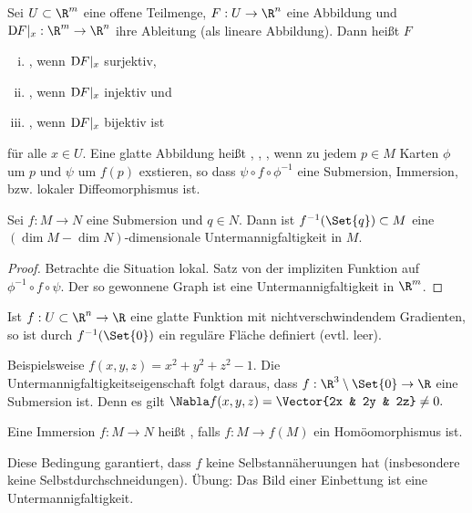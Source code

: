 \begin{df}
    Sei $U \subset \R^m$ eine offene Teilmenge, $F: U \to \R^n$ eine Abbildung und $\Df[F]|_{x}: \R^m \to \R^n$ ihre Ableitung (als lineare Abbildung).
    Dann heißt $F$
    \begin{enumerate}[i)]
        \item
            , wenn $\Df[F]|_{x}$ surjektiv,
        \item
            , wenn $\Df[F]|_{x}$ injektiv und
        \item
            , wenn $\Df[F]|_{x}$ bijektiv ist
    \end{enumerate}
    für alle $x \in U$.
    Eine glatte Abbildung heißt , , , wenn zu jedem $p \in M$ Karten $\phi$ um $p$ und $\psi$ um $f(p)$ exstieren, so dass $\psi \circ f \circ \phi^{-1}$ eine Submersion, Immersion, bzw. lokaler Diffeomorphismus ist.
\end{df}

\begin{st} \label{2.5}
    Sei $f: M \to N$ eine Submersion und $q \in N$.
    Dann ist $f^{-1}(\Set{q}) \subset M$ eine $(\dim M - \dim N)$-dimensionale Untermannigfaltigkeit in $M$.
    \begin{proof}
        Betrachte die Situation lokal.
        Satz von der impliziten Funktion auf $\phi^{-1} \circ f \circ \psi$.
        Der so gewonnene Graph ist eine Untermannigfaltigkeit in $\R^m$.
    \end{proof}
\end{st}

\begin{ex}
    Ist $f: U \subset \R^n \to \R$ eine glatte Funktion mit nichtverschwindendem Gradienten, so ist durch $f^{-1}(\Set{0})$ ein reguläre Fläche definiert (evtl. leer).

    Beispielsweise $f(x,y,z) = x^2 + y^2 + z^2 - 1$.
    Die Untermannigfaltigkeitseigenschaft folgt daraus, dass $f:\R^3 \setminus \Set{0} \to \R$ eine Submersion ist.
    Denn es gilt
    \begin{math}
        \Nabla f(x,y,z) = \Vector{2x & 2y & 2z} \neq 0.
    \end{math}
\end{ex}

\begin{df} \label{2.6}
    Eine Immersion $f:M \to N$ heißt , falls $f: M \to f(M)$ ein Homöomorphismus ist.
    \begin{note}
        Diese Bedingung garantiert, dass $f$ keine Selbstannäheruungen hat (insbesondere keine Selbstdurchschneidungen).
        Übung: Das Bild einer Einbettung ist eine Untermannigfaltigkeit.
    \end{note}
\end{df}

